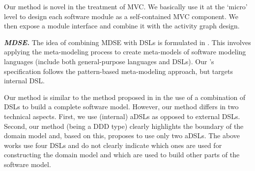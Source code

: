 %

Our method is novel in the treatment of MVC. We basically use it at the `micro' level to design each software module as a self-contained MVC component. We then expose a module interface and combine it with the activity graph design.

\textbf{\textit{MDSE.}}
The idea of combining MDSE with DSLs is formulated in \cite{kleppe_software_2008, brambilla_model-driven_2012}. This involves applying the meta-modeling process to create meta-models of software modeling languages (include both general-purpose languages and DSLs). 
Our \agl's specification follows the pattern-based meta-modeling approach, but targets internal DSL.

Our method is similar to the method proposed in \cite{warmer_model_2007, warmer_building_2006} in the use of a combination of DSLs to build a complete software model. 
%
However, our method differs in two technical aspects. 
First, we use (internal) aDSLs as opposed to external DSLs. Second, our method (being a DDD type) clearly highlights the boundary of the domain model and, based on this, proposes to use only two aDSLs. The above works use four DSLs and do not clearly indicate which ones are used for constructing the domain model and which are used to build other parts of the software model. 

